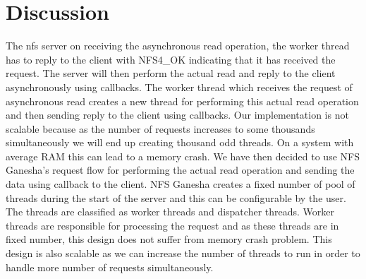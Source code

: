 \section{Discussion}

	The nfs server on receiving the asynchronous read operation, the worker thread has to reply to the client with NFS4\_OK indicating that it has received the request. The server will then perform the actual read and reply to the client asynchronously using callbacks. The worker thread which receives the request of asynchronous read creates a new thread for performing this actual read operation and then sending reply to the client using callbacks. Our implementation is not scalable because as the number of requests increases to some thousands simultaneously we will end up creating thousand odd threads. On a system with average RAM this can lead to a memory crash. We have then decided to use NFS Ganesha's request flow for performing the actual read operation and sending the data using callback to the client. NFS Ganesha creates a fixed number of pool of threads during the start of the server and this can be configurable by the user. The threads are classified as worker threads and dispatcher threads. Worker threads are responsible for processing the request  and as these threads are in fixed number, this design does not suffer from memory crash problem. This design is also scalable as we can increase the number of threads to run in order to handle more number of requests simultaneously. 